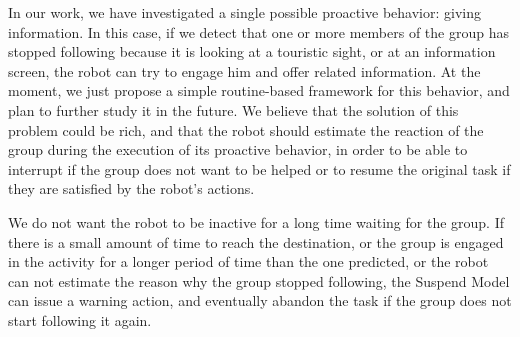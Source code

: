 In our work, we have investigated a single possible proactive behavior: giving information. In this case, if we detect that one or more  members
of the group has stopped following because it is looking at a touristic sight, or at an information screen, the robot can try to engage him and offer related information. At the moment, we just propose a simple routine-based framework for this behavior, and plan to further study it in the future. We believe that the solution of this problem could be rich, and that the robot should estimate the reaction of the group during the execution of its proactive behavior, in order to be able to interrupt if the group does not want to be helped or to resume the original task if they are satisfied by the robot's actions.

We do not want the robot to be inactive for a long time  waiting for the group. If there is a small amount of time to reach the destination, or the group is engaged in the activity for a longer period of time than the one predicted, or the robot can not estimate the reason why the group stopped following, the Suspend Model can issue a warning action, and eventually abandon the task if the group does not start following it again.

